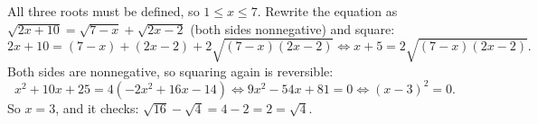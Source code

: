 All three roots must be defined, so $1\le x\le7$. Rewrite the equation as $\sqrt{2x+10}=\sqrt{7-x}+\sqrt{2x-2}$ (both sides nonnegative) and square:
\[
2x+10=(7-x)+(2x-2)+2\sqrt{(7-x)(2x-2)}\iff x+5=2\sqrt{(7-x)(2x-2)} .
\]
Both sides are nonnegative, so squaring again is reversible:
\[
x^2+10x+25=4(-2x^2+16x-14)\iff 9x^2-54x+81=0\iff (x-3)^2=0 .
\]
So $x=\boxed{3}$, and it checks: $\sqrt{16}-\sqrt4=4-2=2=\sqrt4$.

